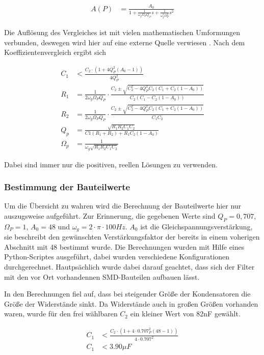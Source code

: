 \begin{align*}
A(P)&=\frac{A_0}{1+\frac{1}{\omega_g\Omega_PQ_P}s+\frac{1}{\omega_g^2\Omega_P^2}s^2}
\end{align*}

Die Auflösung des Vergleiches ist mit vielen mathematischen Umformungen verbunden, deswegen wird hier auf eine
externe Quelle verwiesen \cite[S. 102]{Krucker2000}.
Nach dem Koeffizientenvergleich ergibt sich

\begin{align*}
C_1&<\frac{C_2\cdot(1+4Q^2_P(A_0-1))}{4Q^2_P}\\
R_1&=\frac{1}{2\omega_g\Omega_PQ_P} \cdot \frac{C_2\pm\sqrt{C_2^2-4Q^2_PC_2(C_1+C_2(1-A_0))}}{C_2(C_1-C_2(1-A_0))}   \\
R_2&=\frac{1}{2\omega_g\Omega_PQ_P} \cdot \frac{C_2\pm\sqrt{C_2^2-4Q^2_PC_2(C_1+C_2(1-A_0))}}{C_1C_2}  \\
Q_p&=\frac{\sqrt{R_1R_2C_1C_2}}{C1(R_1+R_2)+R_1C_2(1-A_0)}\\
\Omega_p&=\frac{1}{\omega_g\sqrt{R_1R_2C_1C_2}}
\end{align*}

Dabei sind immer nur die positiven, reellen Lösungen zu verwenden.


\subsubsection{Bestimmung der Bauteilwerte}

Um die Übersicht zu wahren wird die Berechnung der Bauteilwerte hier nur auszugsweise aufgeführt. Zur Erinnerung,
die gegebenen Werte sind $Q_P=0,707$, $\Omega_P=1$, $A_0=48$ und $\omega_g = 2 \cdot \pi \cdot 100Hz$.
$A_0$ ist die Gleichspannungsverstärkung, sie beschreibt den gewünschten Verstärkungsfaktor der bereits in einem voherigen
Abschnitt mit 48 bestimmt wurde. Die Berechnungen wurden mit Hilfe eines Python-Scriptes ausgeführt, dabei wurden verschiedene
Konfigurationen durchgerechnet. Hautpsächlich wurde dabei darauf geachtet, dass sich der Filter mit den vor Ort vorhandennen SMD-Bauteilen
aufbauen lässt.

In den Berechnungen fiel auf, dass bei steigender Größe der Kondensatoren die Größe der Widerstände sinkt. Da Widerstände auch in großen Größen vorhanden waren,
wurde für den frei wählbaren $C_2$ ein kleiner Wert von 82nF gewählt.

\begin{align*}
C_1&<\frac{C_2\cdot(1+4\cdot0.707^2_P(48-1))}{4\cdot0.707^2}\\
C_1&<3.90\mu F
\end{align*}

